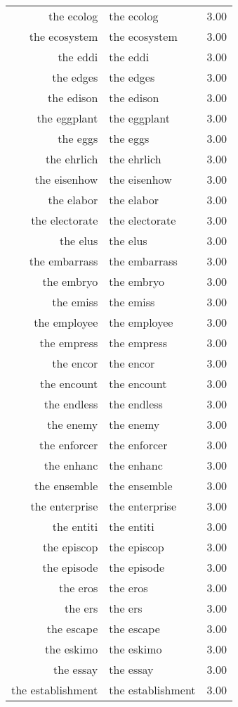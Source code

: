 \begin{table}[ht]
\begin{tabular}{rlr}
  the ecolog & the ecolog & 3.00 \\ 
  the ecosystem & the ecosystem & 3.00 \\ 
  the eddi & the eddi & 3.00 \\ 
  the edges & the edges & 3.00 \\ 
  the edison & the edison & 3.00 \\ 
  the eggplant & the eggplant & 3.00 \\ 
  the eggs & the eggs & 3.00 \\ 
  the ehrlich & the ehrlich & 3.00 \\ 
  the eisenhow & the eisenhow & 3.00 \\ 
  the elabor & the elabor & 3.00 \\ 
  the electorate & the electorate & 3.00 \\ 
  the elus & the elus & 3.00 \\ 
  the embarrass & the embarrass & 3.00 \\ 
  the embryo & the embryo & 3.00 \\ 
  the emiss & the emiss & 3.00 \\ 
  the employee & the employee & 3.00 \\ 
  the empress & the empress & 3.00 \\ 
  the encor & the encor & 3.00 \\ 
  the encount & the encount & 3.00 \\ 
  the endless & the endless & 3.00 \\ 
  the enemy & the enemy & 3.00 \\ 
  the enforcer & the enforcer & 3.00 \\ 
  the enhanc & the enhanc & 3.00 \\ 
  the ensemble & the ensemble & 3.00 \\ 
  the enterprise & the enterprise & 3.00 \\ 
  the entiti & the entiti & 3.00 \\ 
  the episcop & the episcop & 3.00 \\ 
  the episode & the episode & 3.00 \\ 
  the eros & the eros & 3.00 \\ 
  the ers & the ers & 3.00 \\ 
  the escape & the escape & 3.00 \\ 
  the eskimo & the eskimo & 3.00 \\ 
  the essay & the essay & 3.00 \\ 
  the establishment & the establishment & 3.00 \\ 

\end{tabular}
\end{table}
